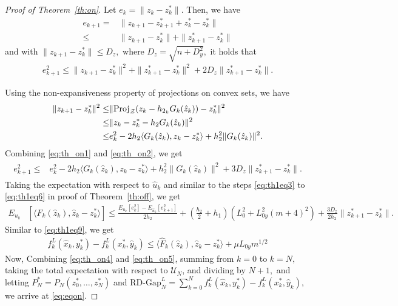 \documentclass{article}
\theoremstyle{plain}
\theoremstyle{definition}
\theoremstyle{remark}
\begin{document}
\begin{proof}[Proof of Theorem~\ref{th:on}]
    Let $e_k = \|z_k-z_k^\ast\|.$ Then, we have
    \begin{align*}
    e_{k+1}=&\|z_{k+1}-z_{k+1}^\ast + z_k^\ast - z_k^\ast \|\\
    \leq& \|z_{k+1}-z_k^\ast\| + \|z_{k+1}^\ast-z_{k}^\ast\|    
    \end{align*} 
    and with
    $\|z_{k+1}-z_k^\ast\|\leq D_z,$ where $D_z=\sqrt{n+D_y^2},$ 
    it holds that
    \begin{align}\label{eq:th_on1}
        e_{k+1}^2 \leq \|z_{k+1}-z_k^\ast\|^2 + \|z_{k+1}^\ast-z_{k}^\ast\|^2 +  2D_z\|z_{k+1}^\ast-z_{k}^\ast\|.
    \end{align}
    
    Using the non-expansiveness property of projections on
    convex sets, we have
    \begin{align}\label{eq:th_on2}
        \|z_{k+1}-z_k^\ast\|^2\leq&\|\mathrm{Proj}_{\mathcal{Z}}(z_k - h_{2_k}G_{k}(\hat{z}_k))-z_k^\ast\|^2\notag\\
        \leq&\|z_k-z_k^\ast-h_2G_{k}(\hat{z}_k)\|^2 \\
        \leq&e_k^2 - 2h_2\langle G_{k}(\hat{z}_k),z_k-z_k^\ast\rangle + h_2^2\|G_{k}(\hat{z}_k)\|^2. \notag
    \end{align}
    Combining \eqref{eq:th_on1} and \eqref{eq:th_on2}, we get
    \begin{align}
    \begin{split}
        e_{k+1}^2\leq & e_k^2-2h_2\langle G_{k}(\hat{z}_k),z_k-z_k^\ast\rangle+h_2^2\|G_{k}(\hat{z}_k)\|^2
        +3D_z\|z_{k+1}^\ast-z_{k}^\ast\|.
        \end{split} \label{eq:th_on3}
    \end{align}
    Taking the expectation with respect to $\hat{u}_k$ and similar to the steps %
    \eqref{eq:th1eq3} to  \eqref{eq:th1eq6} in proof of Theorem~\ref{th:off}, we get 
    \begin{align}\label{eq:th_on4}
    E_{u_k}&[\langle \hat{F}_k(\hat{z}_k),\hat{z}_k-z_k^\ast\rangle]\leq \frac{E_{u_k}[e_k^2]-E_{\hat{u}_k}[e_{k+1}^2]}{2h_2} +(\tfrac{h_2}{2}+h_1)( L_0^2 + L_{0y}^2(m+4)^2)+\frac{3D_z}{2h_2}\|z_{k+1}^\ast-z_{k}^\ast\|. 
    \end{align}
    Similar to \eqref{eq:th1eq9}, we get 
    \begin{align}\label{eq:th_on5}
       f_k^L(\hat{x}_k,y^\ast_k)-f_k^L(x^\ast_k,\hat{y}_k) \leq\langle \hat{F}_k(\hat{z}_k),\hat{z}_k-z_k^\ast\rangle+\mu L_{0y}m^{1/2}
    \end{align}
    Now, Combining \eqref{eq:th_on4} and \eqref{eq:th_on5}, summing from $k=0$ to $k=N,$ taking the total expectation with respect to $\mathcal{U}_{N}$,  and dividing by $N+1,$ and letting $P_N^\ast=P_N(z^\ast_0,\dots,z^\ast_N)$ and $\text{RD-Gap}^L_N =\sum_{k=0}^N f^L_k(\hat{x}_k,y^\ast_k) - f^L_k(x^\ast_k,\hat{y}_k),$ we arrive at \eqref{eq:eqon}. 
    

\end{proof}
\end{document}
